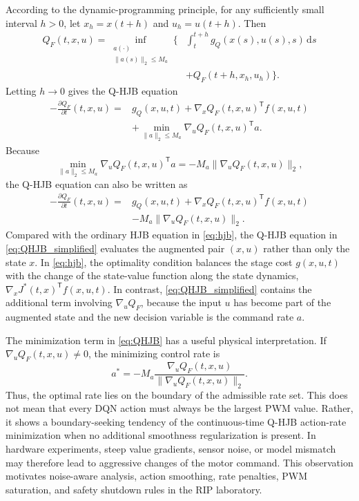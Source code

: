 \documentclass[11pt]{article}
\begin{document}
According to the dynamic-programming principle, for any sufficiently small interval $h>0$, let $x_h=x(t+h)$ and $u_h=u(t+h)$. Then
\begin{equation}
\begin{split}
Q_F(t,x,u)
=
\inf_{\substack{a(\cdot)\\ \|a(s)\|_2\leq M_a}}
\Bigg\{&
\int_t^{t+h} g_Q(x(s),u(s),s)\,\mathrm{d}s\\
&+Q_F(t+h,x_h,u_h)
\Bigg\}.
\end{split}
\label{eq:QF_bellman}
\end{equation}
Letting $h\to0$ gives the Q-HJB equation
\begin{equation}
\begin{split}
-\frac{\partial Q_F}{\partial t}(t,x,u)
={}&g_Q(x,u,t)
+\nabla_xQ_F(t,x,u)^{\mathsf T}f(x,u,t)\\
&+\min_{\|a\|_2\leq M_a}
\nabla_uQ_F(t,x,u)^{\mathsf T}a.
\end{split}
\label{eq:QHJB}
\end{equation}
Because
\begin{equation}
\min_{\|a\|_2\leq M_a}
\nabla_uQ_F(t,x,u)^{\mathsf T}a
=-M_a\|\nabla_uQ_F(t,x,u)\|_2,
\label{eq:QHJB_min}
\end{equation}
the Q-HJB equation can also be written as
\begin{equation}
\begin{split}
-\frac{\partial Q_F}{\partial t}(t,x,u)
={}&g_Q(x,u,t)
+\nabla_xQ_F(t,x,u)^{\mathsf T}f(x,u,t)\\
&-M_a\|\nabla_uQ_F(t,x,u)\|_2.
\end{split}
\label{eq:QHJB_simplified}
\end{equation}
Compared with the ordinary HJB equation in \eqref{eq:hjb}, the Q-HJB equation in \eqref{eq:QHJB_simplified} evaluates the augmented pair $(x,u)$ rather than only the state $x$. In \eqref{eq:hjb}, the optimality condition balances the stage cost $g(x,u,t)$ with the change of the state-value function along the state dynamics, $\nabla_xJ^{*}(t,x)^{\mathsf T}f(x,u,t)$. In contrast, \eqref{eq:QHJB_simplified} contains the additional term involving $\nabla_uQ_F$, because the input $u$ has become part of the augmented state and the new decision variable is the command rate $a$.

The minimization term in \eqref{eq:QHJB} has a useful physical interpretation. If $\nabla_uQ_F(t,x,u)\neq0$, the minimizing control rate is
\begin{equation}
a^{*}
=-M_a\frac{\nabla_uQ_F(t,x,u)}{\|\nabla_uQ_F(t,x,u)\|_2}.
\label{eq:optimal_action_rate}
\end{equation}
Thus, the optimal rate lies on the boundary of the admissible rate set. This does not mean that every DQN action must always be the largest PWM value. Rather, it shows a boundary-seeking tendency of the continuous-time Q-HJB action-rate minimization when no additional smoothness regularization is present. In hardware experiments, steep value gradients, sensor noise, or model mismatch may therefore lead to aggressive changes of the motor command. This observation motivates noise-aware analysis, action smoothing, rate penalties, PWM saturation, and safety shutdown rules in the RIP laboratory.
\end{document}
